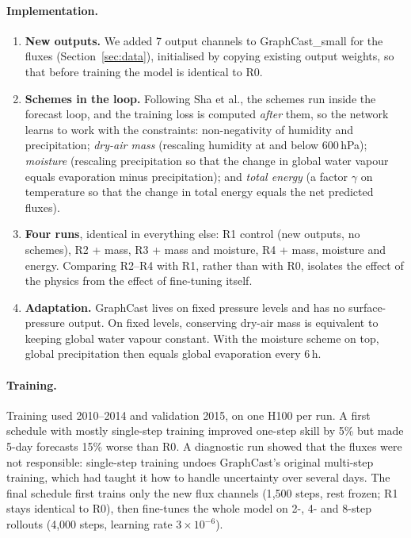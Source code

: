 \documentclass{article}
\newcommand{\R}[1]{\textsf{R#1}}
\begin{document}
\paragraph{Implementation.}
\begin{enumerate}[leftmargin=*]
  \item \textbf{New outputs.} We added 7 output channels to GraphCast\_small for the fluxes (Section~\ref{sec:data}), initialised by copying existing
  output weights, so that before training the model is identical to \R{0}.
  \item \textbf{Schemes in the loop.} Following Sha et al., the schemes run inside the forecast loop, and the training loss is computed \emph{after} them,
  so the network learns to work with the constraints: non-negativity of humidity and precipitation; \emph{dry-air mass} (rescaling humidity at and below 600\,hPa);
  \emph{moisture} (rescaling precipitation so that the change in global water vapour equals evaporation minus precipitation);
  and \emph{total energy} (a factor $\gamma$ on temperature so that the change in total energy equals the net predicted fluxes).
  \item \textbf{Four runs}, identical in everything else: \R{1} control (new outputs, no schemes), \R{2} + mass, \R{3} + mass and moisture,
  \R{4} + mass, moisture and energy. Comparing \R{2}--\R{4} with \R{1}, rather than with \R{0}, isolates the effect of the physics from the effect of fine-tuning itself.
  \item \textbf{Adaptation.} GraphCast lives on fixed pressure levels and has no surface-pressure output. On fixed levels, conserving dry-air mass
  is equivalent to keeping global water vapour constant. With the moisture scheme on top, global precipitation then equals global evaporation every 6\,h.
\end{enumerate}

\paragraph{Training.}
Training used 2010--2014 and validation 2015, on one H100 per run. A first schedule with mostly single-step training improved one-step skill by 5\%
but made 5-day forecasts 15\% worse than \R{0}. A diagnostic run showed that the fluxes were not responsible: single-step training undoes GraphCast's original multi-step training,
which had taught it how to handle uncertainty over several days. The final schedule first trains only the new flux channels (1{,}500 steps, rest frozen; \R{1} stays identical to \R{0}),
then fine-tunes the whole model on 2-, 4- and 8-step rollouts (4{,}000 steps, learning rate $3\times10^{-6}$).
\end{document}
